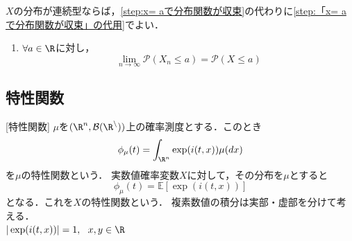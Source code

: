     $X$の分布が連続型ならば，\eqref{step:x= aで分布関数が収束}の代わりに\eqref{step:「x= aで分布関数が収束」の代用}でよい．
\begin{enumerate}
    \item [$(2)'$]\label{step:「x= aで分布関数が収束」の代用}
    $\forall a\in \R$に対し，
\begin{equation}
    \lim_{n\to \infty} \mathcal{P}(X_n\le a)= \mathcal{P}(X\le a)
\end{equation}
\end{enumerate}

\subsection{特性関数}
[特性関数]
    $\mu$を$(\R^n, \mathcal{B(\R^n)})$上の確率測度とする．このとき
\begin{equation}
    \phi_\mu(t)= \int_{\R^n} \exp(i(t, x))\mu(dx)
\end{equation}
    を$\mu$の特性関数という．
    実数値確率変数$X$に対して，その分布を$\mu$とすると
\begin{equation}
    \phi_\mu(t)= \mathbb{E}[\exp(i(t, x))]
\end{equation}
    となる．これを$X$の特性関数という．
    複素数値の積分は実部・虚部を分けて考える．\\
    $|\exp(i(t, x))|= 1,\ \ x, y\in \R$


